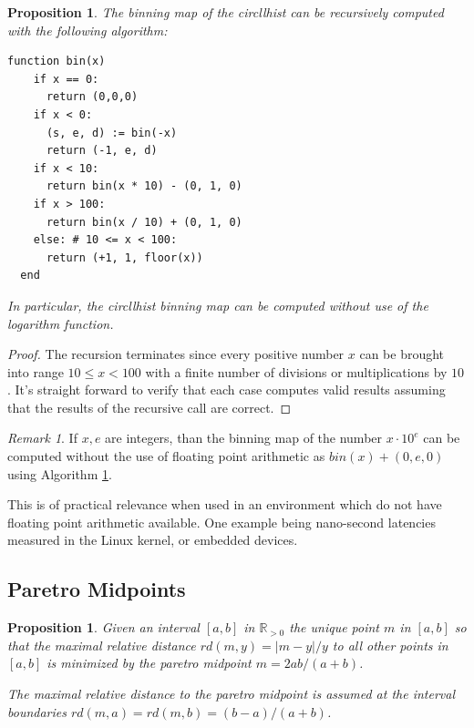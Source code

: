 \documentclass{article}
\theoremstyle{plain}
\newtheorem{proposition}[definition]{Proposition}
\theoremstyle{remark}
\newtheorem{remark}[definition]{Remark}
\newcommand{\IR}{\mathbb{R}}
\begin{document}
\begin{proposition} \label{prop:rec}
  The binning map of the circllhist can be recursively computed with the following algorithm:

  \begin{cetner}
    \begin{BVerbatim}[fontfamily=tt]
  function bin(x)
    if x == 0:
      return (0,0,0)
    if x < 0:
      (s, e, d) := bin(-x)
      return (-1, e, d)
    if x < 10:
      return bin(x * 10) - (0, 1, 0)
    if x > 100:
      return bin(x / 10) + (0, 1, 0)
    else: # 10 <= x < 100:
      return (+1, 1, floor(x))
  end
    \end{BVerbatim}
  \end{cetner}

  In particular, the circllhist binning map can be computed without use of the logarithm function.
\end{proposition}

\begin{proof}
  The recursion terminates since every positive number $x$ can be brought into range $10 \leq x <
  100$ with a finite number of divisions or multiplications by $10$.  It's straight forward to
  verify that each case computes valid results assuming that the results of the recursive call are
  correct.
\end{proof}

\begin{remark}
  If $x,e$ are integers, than the binning map of the number $x \cdot 10^{e}$ can be computed without
  the use of floating point arithmetic as $bin(x) + (0,e,0)$ using Algorithm \ref{prop:rec}.

  This is of practical relevance when used in an environment which do not have floating
  point arithmetic available. One example being nano-second latencies measured in the Linux kernel,
  or embedded devices.
\end{remark}

\subsection{Paretro Midpoints}

\begin{proposition} \label{prop:pdist}
  Given an interval $[a,b]$ in $\IR_{>0}$ the unique point $m$ in $[a,b]$ so that the maximal
  relative distance $rd(m, y) = |m-y|/y$ to all other points in $[a,b]$ is minimized
  by the paretro midpoint
  $m = 2ab / (a + b)$.

  The maximal relative distance to the paretro midpoint is assumed at the interval boundaries
  $rd(m,a) = rd(m,b) = (b - a) / (a + b)$.
\end{proposition}
\end{document}
